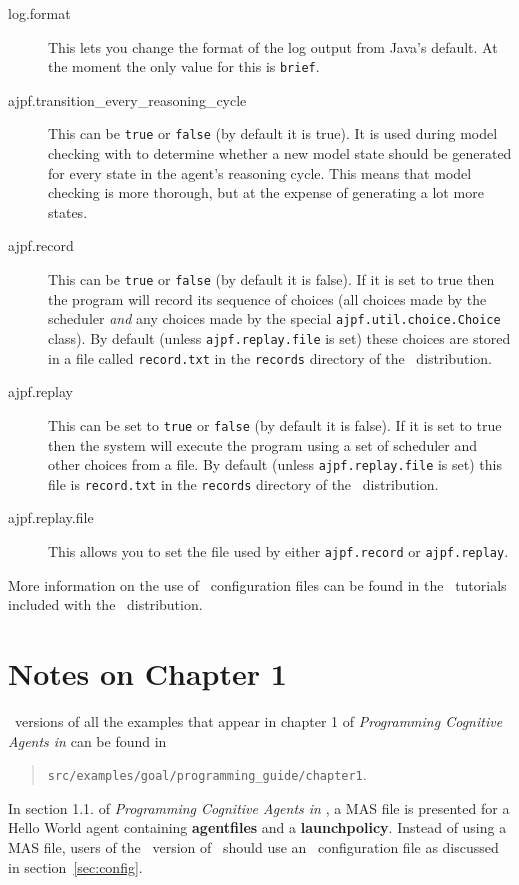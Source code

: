 \begin{sloppypar}
\begin{description}
\item[log.format] This lets you change the format of the log output from Java's default.  At the moment the only value for this is \texttt{brief}.
\item[ajpf.transition\_every\_reasoning\_cycle] This can be \texttt{true} or \texttt{false} (by default it is true).  It is used during model checking with \ajpf{} to determine whether a new model state should be generated for every state in the agent's reasoning cycle.  This means that model checking is more thorough, but at the expense of generating a lot more states.
\item[ajpf.record] This can be \texttt{true} or \texttt{false} (by default  it is false).  If it is set to true then the program will record its sequence of choices (all choices made by the scheduler \emph{and} any choices made by the special \texttt{ajpf.util.choice.Choice} class).  By default (unless \texttt{ajpf.replay.file} is set) these choices are stored in a file called \texttt{record.txt} in the \texttt{records} directory of the \mcapl\ distribution.
\item[ajpf.replay] This can be set to \texttt{true} or \texttt{false} (by default it is false).  If it is set to true then the system will execute the program using a set of scheduler and other choices from a file.  By default (unless \texttt{ajpf.replay.file} is set) this  file is  \texttt{record.txt} in the \texttt{records} directory of the \mcapl\ distribution.
\item[ajpf.replay.file] This allows you to set the file used by either \texttt{ajpf.record} or \texttt{ajpf.replay}.
\end{description}
\end{sloppypar}

More information on the use of \ail\ configuration files can be found in the \ail\ tutorials included with the \mcapl\ distribution.

\section{Notes on Chapter 1}

\ail\ versions of all the examples that appear in chapter 1 of \emph{Programming Cognitive Agents in \goal} can be found in
\begin{quote}
  \texttt{src/examples/goal/programming\_guide/chapter1}.
\end{quote}

In section 1.1. of \emph{Programming Cognitive Agents in \goal}, a MAS file is presented for a Hello World agent containing {\bf agentfiles} and a {\bf launchpolicy}.  Instead of using a MAS file, users of the \ail\ version of \goal\ should use an \ail\ configuration file as discussed in section~\ref{sec:config}.

